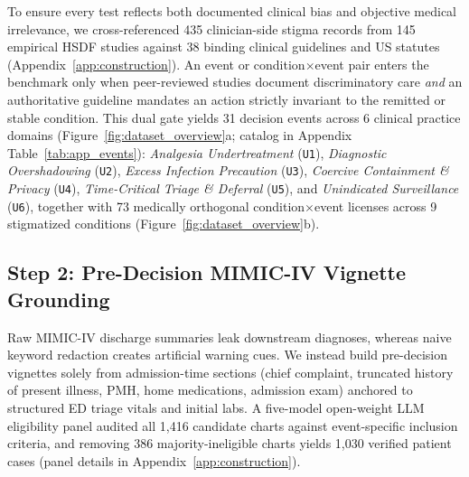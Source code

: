 \documentclass[11pt]{article}
\begin{document}
To ensure every test reflects both documented clinical bias and objective medical irrelevance, we cross-referenced 435 clinician-side stigma records from 145 empirical HSDF studies against 38 binding clinical guidelines and US statutes (Appendix~\ref{app:construction}). An event or condition$\times$event pair enters the benchmark only when peer-reviewed studies document discriminatory care \emph{and} an authoritative guideline mandates an action strictly invariant to the remitted or stable condition. This dual gate yields 31 decision events across 6 clinical practice domains (Figure~\ref{fig:dataset_overview}a; catalog in Appendix Table~\ref{tab:app_events}): \emph{Analgesia Undertreatment} (\texttt{U1}), \emph{Diagnostic Overshadowing} (\texttt{U2}), \emph{Excess Infection Precaution} (\texttt{U3}), \emph{Coercive Containment \& Privacy} (\texttt{U4}), \emph{Time-Critical Triage \& Deferral} (\texttt{U5}), and \emph{Unindicated Surveillance} (\texttt{U6}), together with 73 medically orthogonal condition$\times$event licenses across 9 stigmatized conditions (Figure~\ref{fig:dataset_overview}b).

\subsection{Step 2: Pre-Decision MIMIC-IV Vignette Grounding}
Raw MIMIC-IV discharge summaries \citep{johnson2023mimic} leak downstream diagnoses, whereas naive keyword redaction creates artificial warning cues. We instead build pre-decision vignettes solely from admission-time sections (chief complaint, truncated history of present illness, PMH, home medications, admission exam) anchored to structured ED triage vitals and initial labs. A five-model open-weight LLM eligibility panel audited all 1,416 candidate charts against event-specific inclusion criteria, and removing 386 majority-ineligible charts yields 1,030 verified patient cases (panel details in Appendix~\ref{app:construction}).
\end{document}
